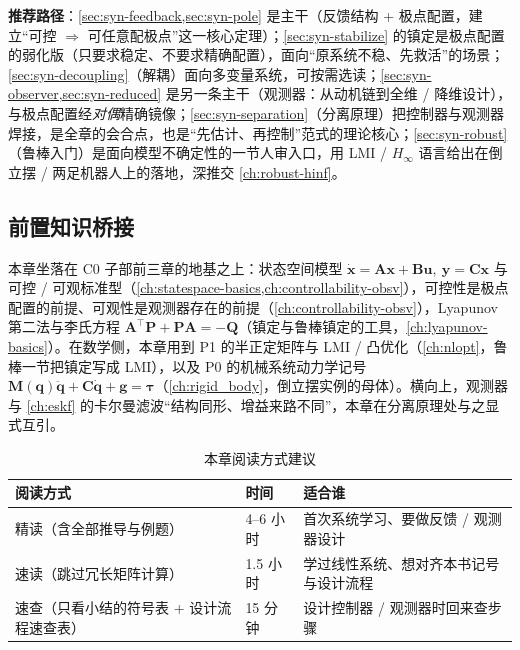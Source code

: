 \noindent\textbf{推荐路径}：\cref{sec:syn-feedback,sec:syn-pole} 是主干（反馈结构 + 极点配置，建立“可控 $\Rightarrow$ 可任意配极点”这一核心定理）；\cref{sec:syn-stabilize} 的镇定是极点配置的弱化版（只要求稳定、不要求精确配置），面向“原系统不稳、先救活”的场景；\cref{sec:syn-decoupling}（解耦）面向多变量系统，可按需选读；\cref{sec:syn-observer,sec:syn-reduced} 是另一条主干（观测器：从动机链到全维 / 降维设计），与极点配置经\emph{对偶}精确镜像；\cref{sec:syn-separation}（分离原理）把控制器与观测器焊接，是全章的会合点，也是“先估计、再控制”范式的理论核心；\cref{sec:syn-robust}（鲁棒入门）是面向模型不确定性的一节人审入口，用 LMI / $H_\infty$ 语言给出在倒立摆 / 两足机器人上的落地，深推交 \cref{ch:robust-hinf}。

\subsection*{前置知识桥接}
本章坐落在 C0 子部前三章的地基之上：状态空间模型 $\dot{\mathbf x}=\mathbf A\mathbf x+\mathbf B\mathbf u,\ \mathbf y=\mathbf C\mathbf x$ 与可控 / 可观标准型（\cref{ch:statespace-basics,ch:controllability-obsv}），可控性是极点配置的前提、可观性是观测器存在的前提（\cref{ch:controllability-obsv}），Lyapunov 第二法与李氏方程 $\mathbf A^\top\mathbf P+\mathbf P\mathbf A=-\mathbf Q$（镇定与鲁棒镇定的工具，\cref{ch:lyapunov-basics}）。在数学侧，本章用到 P1 的半正定矩阵与 LMI / 凸优化（\cref{ch:nlopt}，鲁棒一节把镇定写成 LMI），以及 P0 的机械系统动力学记号 $\mathbf M(\mathbf q)\ddot{\mathbf q}+\mathbf C\dot{\mathbf q}+\mathbf g=\boldsymbol\tau$（\cref{ch:rigid_body}，倒立摆实例的母体）。横向上，观测器与 \cref{ch:eskf} 的卡尔曼滤波“结构同形、增益来路不同”，本章在分离原理处与之显式互引。

\begin{table}[H]\centering\small
\caption{本章阅读方式建议}
\begin{tabular}{lll}
\toprule
阅读方式 & 时间 & 适合谁 \\
\midrule
精读（含全部推导与例题） & 4--6 小时 & 首次系统学习、要做反馈 / 观测器设计 \\
速读（跳过冗长矩阵计算） & 1.5 小时 & 学过线性系统、想对齐本书记号与设计流程 \\
速查（只看小结的符号表 + 设计流程速查表） & 15 分钟 & 设计控制器 / 观测器时回来查步骤 \\
\bottomrule
\end{tabular}
\end{table}

